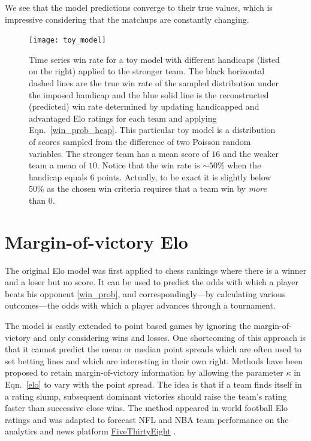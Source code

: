 \documentclass[aps,prc,reprint,amsmath,superscriptaddress,nofootinbib]{revtex4-1}
\begin{document}
We see that the model predictions converge to their true values, which is impressive considering that the matchups are constantly changing.

\begin{figure}
  \texttt{[image: toy\_model]}
  \caption{\label{fig:toy_model} Time series win rate for a toy model with different handicaps (listed on the right) applied to the stronger team. The black horizontal dashed lines are the true win rate of the sampled distribution under the imposed handicap and the blue solid line is the reconstructed (predicted) win rate determined by updating handicapped and advantaged Elo ratings for each team and applying Eqn.~\eqref{win_prob_hcap}. This particular toy model is a distribution of scores sampled from the difference of two Poisson random variables. The stronger team has a mean score of $16$ and the weaker team a mean of $10$. Notice that the win rate is $\sim\!50\%$ when the handicap equals $6$ points. Actually, to be exact it is slightly below 50\% as the chosen win criteria requires that a team win by \emph{more} than 0.}
\end{figure}

\section{Margin-of-victory Elo}

The original Elo model was first applied to chess rankings where there is a winner and a loser but no score.
It can be used to predict the odds with which a player beats his opponent \eqref{win_prob}, and correspondingly---by calculating various outcomes---the odds with which a player advances through a tournament. 

The model is easily extended to point based games by ignoring the margin-of-victory and only considering wins and losses.
One shortcoming of this approach is that it cannot predict the mean or median point spreads which are often used to set betting lines and which are interesting in their own right.
Methods have been proposed to retain margin-of-victory information by allowing the parameter $\kappa$ in Eqn.~\eqref{elo} to vary with the point spread.
The idea is that if a team finds itself in a rating slump, subsequent dominant victories should raise the team's rating faster than successive close wins.
The method appeared in world football Elo ratings \cite{footballratings} and was adapted to forecast NFL and NBA team performance on the analytics and news platform \href{www.fivethirtyeight.com}{FiveThirtyEight} \cite{538NFL, 538NBA}.
\end{document}
